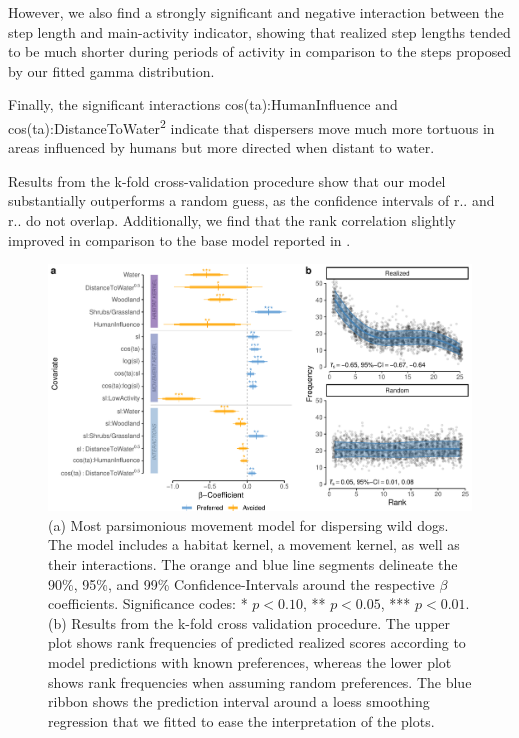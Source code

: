 \documentclass[abstract=on,10pt,a4paper,bibliography=totocnumbered]{article}
\begin{document}
However, we also find a strongly significant and negative interaction between
the step length and main-activity indicator, showing that realized step lengths
tended to be much shorter during periods of activity in comparison to the steps
proposed by our fitted gamma distribution.

Finally, the significant interactions \textsf{cos(ta):HumanInfluence} and
\textsf{cos(ta):DistanceToWater\textsuperscript{2}} indicate that dispersers
move much more tortuous in areas influenced by humans but more directed when
distant to water.

Results from the k-fold cross-validation procedure show that our model
substantially outperforms a random guess, as the confidence intervals of r.. and
r.. do not overlap. Additionally, we find that the rank correlation slightly
improved in comparison to the base model reported in \citep{Hofmann.2021}.

\begin{figure}
  \begin{center}
    \includegraphics[width=\textwidth]{99_MovementModel}
    \caption{(a) Most parsimonious movement model for dispersing wild dogs. The
    model includes a habitat kernel, a movement kernel, as well as their
    interactions. The orange and blue line segments delineate the 90\%, 95\%,
    and 99\% Confidence-Intervals around the respective \(\beta\) coefficients.
    Significance codes: * \(p < 0.10\), ** \(p < 0.05\), *** \(p < 0.01\). (b)
    Results from the k-fold cross validation procedure. The upper plot shows
    rank frequencies of predicted realized scores according to model predictions
    with known preferences, whereas the lower plot shows rank frequencies when
    assuming random preferences. The blue ribbon shows the prediction interval
    around a loess smoothing regression that we fitted to ease the
    interpretation of the plots.}
    \label{MovementModel}
  \end{center}
\end{figure}
\end{document}
